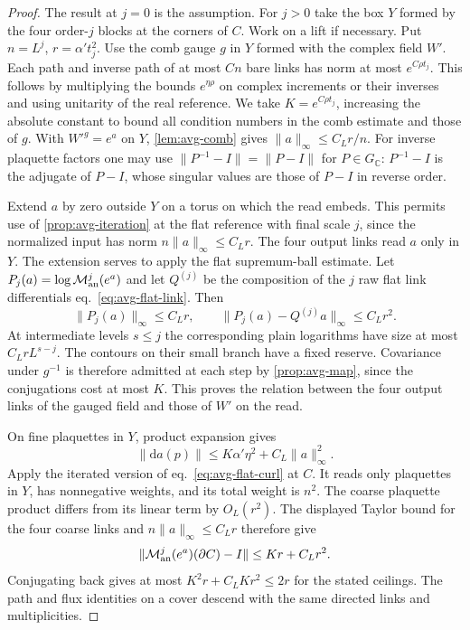 \documentclass[11pt,letterpaper,reqno]{amsart}
\numberwithin{equation}{section}
\renewcommand{\eqref}[1]{\textup{eq.~\ref{#1}}}
\theoremstyle{definition}
\theoremstyle{remark}
\begin{document}
\begin{proof}
The result at \(j=0\) is the assumption. For \(j>0\) take the
box \(Y\) formed by the four order-\(j\) blocks at the corners of
\(C\). Work on a lift if necessary. Put \(n=L^j\), \(r=\alpha't_j^2\).
Use the comb gauge \(g\) in \(Y\) formed with the complex field
\(W'\). Each path and inverse path of at most \(C n\) bare links
has norm at most \(e^{C\rho t_j}\). This follows by multiplying
the bounds \(e^{\eta\rho}\) on complex increments or their
inverses and using unitarity of the real reference. We take
\(K=e^{C\rho t_j}\), increasing the absolute constant to bound
all condition numbers in the comb estimate and those of \(g\).
With \(W'^g=e^a\) on \(Y\), \cref{lem:avg-comb} gives
\(\|a\|_\infty\leq C_L r/n\). For inverse plaquette factors
one may use \(\|P^{-1}-I\|=\|P-I\|\) for \(P\in G_{\mathbb C}\):
\(P^{-1}-I\) is the adjugate of \(P-I\), whose singular
values are those of \(P-I\) in reverse order.

Extend \(a\) by zero outside \(Y\) on a torus on which the read
embeds. This permits use of \cref{prop:avg-iteration} at the flat
reference with final scale \(j\), since the normalized input
has norm \(n\|a\|_\infty\leq C_L r\).
The four output links read \(a\) only in \(Y\). The extension
serves to apply the flat supremum-ball estimate.
Let \(P_j(a)=\log\mathcal M_{\rm an}^j(e^a)\) and let \(Q^{(j)}\) be
the composition of the \(j\) raw flat link differentials
\eqref{eq:avg-flat-link}. Then
\[
 \|P_j(a)\|_\infty\leq C_L r,\qquad
 \|P_j(a)-Q^{(j)}a\|_\infty\leq C_L r^2 .
\]
At intermediate levels \(s\leq j\) the corresponding plain
logarithms have size at most \(C_L r L^{s-j}\).
The contours on their small branch have a fixed reserve.
Covariance under \(g^{-1}\) is therefore admitted at each
step by \cref{prop:avg-map}, since the conjugations cost at
most \(K\). This proves the relation between the four output
links of the gauged field and those of \(W'\) on the read.

On fine plaquettes in \(Y\), product expansion gives
\[
 \|\mathrm da(p)\|\leq K\alpha'\eta^2+C_L\|a\|_\infty^2.
\]
Apply the iterated version of \eqref{eq:avg-flat-curl} at \(C\).
It reads only plaquettes in \(Y\), has nonnegative weights,
and its total weight is \(n^2\). The coarse plaquette product
differs from its linear term by \(O_L(r^2)\). The displayed
Taylor bound for the four coarse links and \(n\|a\|_\infty
\leq C_L r\) therefore give
\[
 \|\mathcal M_{\rm an}^j(e^a)(\partial C)-I\|\leq Kr+C_L r^2.
\]
Conjugating back gives at most \(K^2r+C_LKr^2\leq2r\)
for the stated ceilings. The path and flux identities on a
cover descend with the same directed links and multiplicities.
\end{proof}
\end{document}
